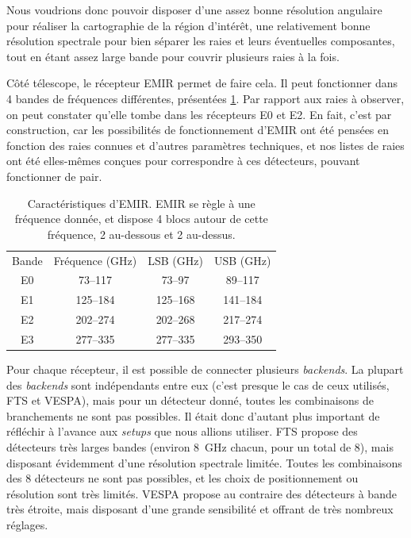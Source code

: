 \documentclass[a4paper,10pt,french]{article}
\newcommand{\GHz}{\si{\giga\hertz}}
\begin{document}
Nous voudrions donc pouvoir disposer d’une assez bonne résolution angulaire
pour réaliser la cartographie de la région d’intérêt, une relativement bonne
résolution spectrale pour bien séparer les raies et leurs éventuelles
composantes, tout en étant assez large bande pour couvrir plusieurs raies à la
fois.

Côté télescope, le récepteur EMIR permet de faire cela. Il peut fonctionner
dans 4 bandes de fréquences différentes, présentées \cref{tab:emir}. Par
rapport aux raies à observer, on peut constater qu’elle tombe dans les
récepteurs E0 et E2. En fait, c’est par construction, car les possibilités de
fonctionnement d’EMIR ont été pensées en fonction des raies connues et d’autres
paramètres techniques, et nos listes de raies ont été elles-mêmes conçues pour
correspondre à ces détecteurs, pouvant fonctionner de pair.

\begin{table}[ht]
    \centering
    \begin{tabular}{cccc}
        \hline
        \hline
        Bande & Fréquence (\GHz)    & LSB (\GHz)          & USB (\GHz)          \\
        E0    & \numrange{ 73}{117} & \numrange{ 73}{97 } & \numrange{ 89}{117} \\
        E1    & \numrange{125}{184} & \numrange{125}{168} & \numrange{141}{184} \\
        E2    & \numrange{202}{274} & \numrange{202}{268} & \numrange{217}{274} \\
        E3    & \numrange{277}{335} & \numrange{277}{335} & \numrange{293}{350} \\
        \hline
    \end{tabular}
    \caption{Caractéristiques d’EMIR. EMIR se règle à une fréquence donnée, et
    dispose 4 blocs autour de cette fréquence, 2 au-dessous et 2 au-dessus.}
    \label{tab:emir}
\end{table}

Pour chaque récepteur, il est possible de connecter plusieurs
\textit{backends}. La plupart des \textit{backends} sont indépendants entre eux
(c’est presque le cas de ceux utilisés, FTS et VESPA), mais pour un détecteur
donné, toutes les combinaisons de branchements ne sont pas possibles. Il était
donc d’autant plus important de réfléchir à l’avance aux \textit{setups} que
nous allions utiliser. FTS propose des détecteurs très larges bandes (environ
\SI{8}{\giga\hertz} chacun, pour un total de 8), mais disposant évidemment
d’une résolution spectrale limitée. Toutes les combinaisons des 8 détecteurs ne
sont pas possibles, et les choix de positionnement ou résolution sont très
limités. VESPA propose au contraire des détecteurs à bande très étroite, mais
disposant d’une grande sensibilité et offrant de très nombreux réglages.
\end{document}
